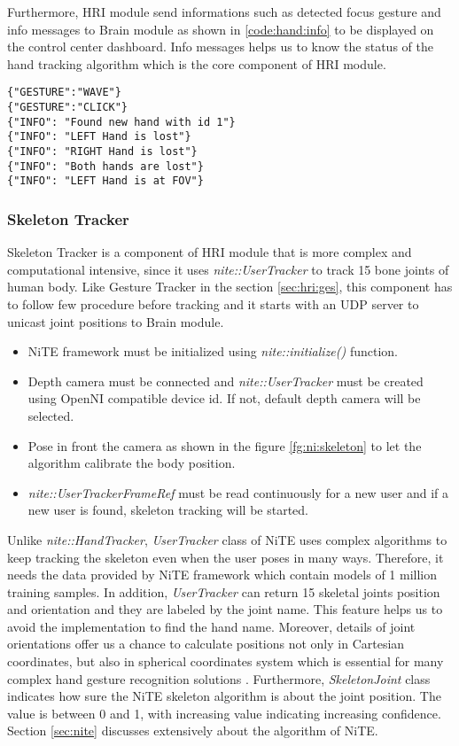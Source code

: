 Furthermore, HRI module send informations such as detected focus gesture and info messages to Brain module as shown in \ref{code:hand:info} to be displayed on the control center dashboard. Info messages helps us to know the status of the hand tracking algorithm which is the core component of HRI module. 

\begin{lstlisting}
{"GESTURE":"WAVE"}
{"GESTURE":"CLICK"}
{"INFO": "Found new hand with id 1"}
{"INFO": "LEFT Hand is lost"}
{"INFO": "RIGHT Hand is lost"}
{"INFO": "Both hands are lost"}
{"INFO": "LEFT Hand is at FOV"}
\end{lstlisting}
\label{code:hand:info}

\subsubsection{Skeleton Tracker}
Skeleton Tracker is a component of HRI module that is more complex and computational intensive, since it uses \textit{nite::UserTracker} to track 15 bone joints of human body. Like Gesture Tracker in the section \ref{sec:hri:ges}, this component has to follow few procedure before tracking and it starts with an UDP server to unicast joint positions to Brain module.
 
 \begin{itemize}
 	\item NiTE framework must be initialized using \textit{nite::initialize()} function.
 	\item Depth camera must be connected and \textit{nite::UserTracker} must be created using OpenNI compatible  device id. If not, default depth camera will be selected.
 	\item Pose in front the camera as shown in the figure \ref{fg:ni:skeleton} to let the algorithm calibrate the body position. 
 	\item \textit{nite::UserTrackerFrameRef }must be read continuously for a new user and if a new user is found, skeleton tracking will be started.
 \end{itemize}
 
 
 
 Unlike \textit{nite::HandTracker}, \textit{UserTracker} class of NiTE uses complex algorithms to keep tracking the skeleton even when the user poses in many ways. Therefore, it needs the data provided by NiTE framework which contain models of 1 million training samples. In addition, \textit{UserTracker} can return 15 skeletal joints position and orientation and they are labeled by the joint name. This feature helps us to avoid the implementation to find the hand name. Moreover, details of joint orientations offer us a chance to calculate positions not only in Cartesian coordinates, but also in spherical coordinates system which is essential for many complex hand gesture recognition solutions \cite{21}. Furthermore, \textit{SkeletonJoint} class indicates how sure the NiTE skeleton algorithm is about the joint position. The value is between 0 and 1, with increasing value indicating increasing confidence. Section \ref{sec:nite} discusses extensively about the algorithm of NiTE.
 
